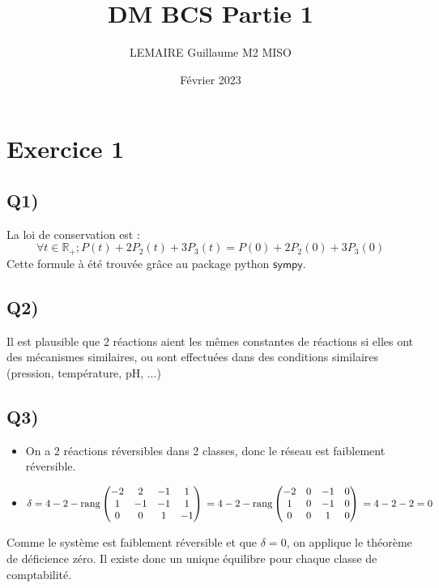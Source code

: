 \documentclass[12pt,a4paper]{article}
\title{DM BCS Partie 1}
\author{LEMAIRE Guillaume M2 MISO}
\date{Février 2023}
\newcommand{\R}{\mathbb{R}}
\begin{document}
\maketitle

\section*{Exercice 1}
\subsection*{Q1)}

La loi de conservation est : $$\forall t\in\R_+; P(t)+2P_2(t)+3P_3(t)=P(0)+2P_2(0)+3P_3(0)$$
Cette formule à été trouvée grâce au package python $\mathsf{sympy}$.

\subsection*{Q2)}

Il est plausible que 2 réactions aient les mêmes constantes de réactions si elles ont des mécanismes similaires, ou sont effectuées dans des conditions similaires (pression, température, pH, ...)

\subsection*{Q3)}

\begin{itemize}
\item On a $2$ réactions réversibles dans 2 classes, donc le réseau est faiblement réversible.

\item $\delta = 4-2-\text{rang}
\begin{pmatrix}
-2 & 2 & -1 & 1 \\
1 & -1 & -1 & 1 \\
0 & 0 & 1 & -1 \\
\end{pmatrix} \\= 4-2-\text{rang}
\begin{pmatrix}
-2 & 0 & -1 & 0 \\
1 & 0 & -1 & 0 \\
0 & 0 & 1 & 0 \\ 
\end{pmatrix} \\= 4-2-2 = 0$
\end{itemize}
\noindent\newline
Comme le système est faiblement réversible et que $\delta=0$, on applique le théorème de déficience zéro.
Il existe donc un unique équilibre pour chaque classe de comptabilité.
\end{document}
